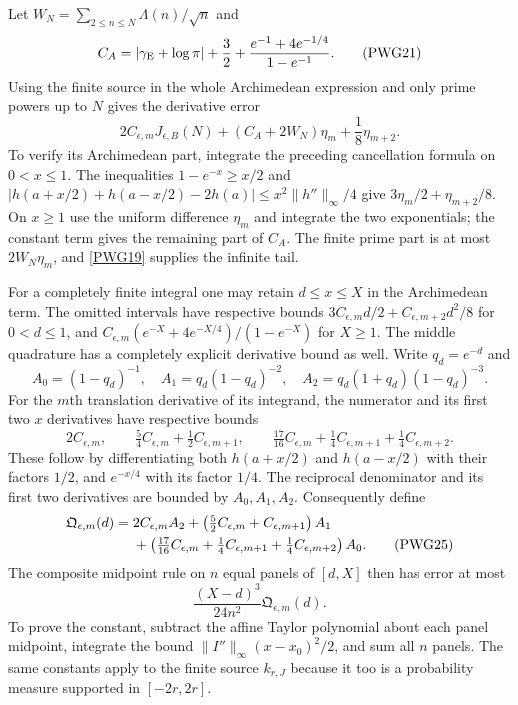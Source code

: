 Let $W_N=\sum_{2\le n\le N}\Lambda(n)/\sqrt n$ and
\begin{equation}
 C_A=|\gamma_{\rm E}+\log\pi|+\frac32+
                    \frac{e^{-1}+4e^{-1/4}}{1-e^{-1}}.
                                                               \tag{PWG21}\label{PWG21}
\end{equation}
Using the finite source in the whole Archimedean expression and only prime powers up to $N$ gives the derivative error
\begin{equation}
 \boxed{2C_{\epsilon,m}J_{\epsilon,B}(N)
       +(C_A+2W_N)\eta_m+\frac18\eta_{m+2}.}                 \tag{PWG22}\label{PWG22}
\end{equation}
To verify its Archimedean part, integrate the preceding cancellation formula on $0<x\le1$. The inequalities $1-e^{-x}\ge x/2$ and
$|h(a+x/2)+h(a-x/2)-2h(a)|\le x^2\|h''\|_\infty/4$
give $3\eta_m/2+\eta_{m+2}/8$. On $x\ge1$ use the uniform difference $\eta_m$ and integrate the two exponentials; the constant term gives the remaining part of $C_A$. The finite prime part is at most $2W_N\eta_m$, and \eqref{PWG19} supplies the infinite tail.

For a completely finite integral one may retain $d\le x\le X$ in the Archimedean term. The omitted intervals have respective bounds
$3C_{\epsilon,m}d/2+C_{\epsilon,m+2}d^2/8$ for $0<d\le1$, and
$C_{\epsilon,m}(e^{-X}+4e^{-X/4})/(1-e^{-X})$ for $X\ge1$.
The middle quadrature has a completely explicit derivative bound as well. Write $q_d=e^{-d}$ and
\[
 A_0=(1-q_d)^{-1},\quad A_1=q_d(1-q_d)^{-2},\quad
 A_2=q_d(1+q_d)(1-q_d)^{-3}.
\]
For the $m$th translation derivative of its integrand, the numerator and its first two $x$ derivatives have respective bounds
\[
 2C_{\epsilon,m},\qquad
 \tfrac54C_{\epsilon,m}+\tfrac12C_{\epsilon,m+1},\qquad
 \tfrac{17}{16}C_{\epsilon,m}+\tfrac14C_{\epsilon,m+1}
                          +\tfrac14C_{\epsilon,m+2}.
\]
These follow by differentiating both $h(a+x/2)$ and $h(a-x/2)$ with their factors $1/2$, and $e^{-x/4}$ with its factor $1/4$. The reciprocal denominator and its first two derivatives are bounded by $A_0,A_1,A_2$. Consequently define
\begin{align}
 \mathfrak Q_{\epsilon,m}(d)={}&2C_{\epsilon,m}A_2
 +\left(\tfrac52C_{\epsilon,m}+C_{\epsilon,m+1}\right)A_1\notag\\
 &+\left(\tfrac{17}{16}C_{\epsilon,m}
    +\tfrac14C_{\epsilon,m+1}+\tfrac14C_{\epsilon,m+2}\right)A_0.
                                                               \tag{PWG25}\label{PWG25}
\end{align}
The composite midpoint rule on $n$ equal panels of $[d,X]$ then has error at most
\begin{equation}
 \frac{(X-d)^3}{24n^2}\mathfrak Q_{\epsilon,m}(d).
                                                               \tag{PWG26}\label{PWG26}
\end{equation}
To prove the constant, subtract the affine Taylor polynomial about each panel midpoint, integrate the bound $\|I''\|_\infty(x-x_0)^2/2$, and sum all $n$ panels. The same constants apply to the finite source $k_{r,J}$ because it too is a probability measure supported in $[-2r,2r]$.

